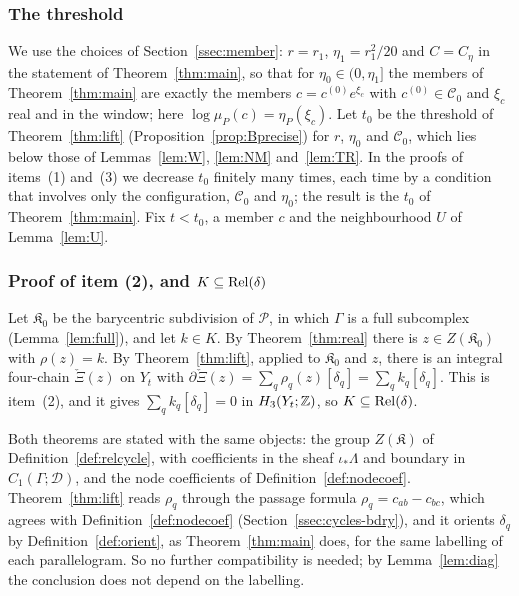 \subsubsection*{The threshold}
We use the choices of Section~\ref{ssec:member}: $r=r_1$, $\eta_1=r_1^2/20$ and $C=C_\eta$ in the statement of
Theorem~\ref{thm:main}, so that for $\eta_0\in(0,\eta_1]$ the members of Theorem~\ref{thm:main} are exactly the members
$c=c^{(0)}e^{\xi_c}$ with $c^{(0)}\in\mathscr C_0$ and $\xi_c$ real and in the window; here $\log\mu_P(c)=\eta_P(\xi_c)$.
Let $t_0$ be the threshold of Theorem~\ref{thm:lift} (Proposition~\ref{prop:Bprecise}) for $r$, $\eta_0$ and
$\mathscr C_0$, which lies below those of Lemmas~\ref{lem:W}, \ref{lem:NM} and~\ref{lem:TR}. In the proofs of items~(1)
and~(3) we decrease $t_0$ finitely many times, each time by a condition that involves only the configuration,
$\mathscr C_0$ and $\eta_0$; the result is the $t_0$ of Theorem~\ref{thm:main}. Fix $t<t_0$, a member $c$ and the
neighbourhood $U$ of Lemma~\ref{lem:U}.

\subsubsection*{Proof of item (2), and $K\subseteq\operatorname{Rel}(\delta)$}
Let $\mathfrak K_0$ be the barycentric subdivision of $\mathscr P$, in which $\Gamma$ is a full subcomplex
(Lemma~\ref{lem:full}), and let $k\in K$. By Theorem~\ref{thm:real} there is $z\in Z(\mathfrak K_0)$ with $\rho(z)=k$. By
Theorem~\ref{thm:lift}, applied to $\mathfrak K_0$ and $z$, there is an integral four-chain $\check\Xi(z)$ on $Y_t$ with
$\partial\check\Xi(z)=\sum_q\rho_q(z)[\delta_q]=\sum_qk_q[\delta_q]$. This is item~(2), and it gives
$\sum_qk_q[\delta_q]=0$ in $H_3(Y_t;\mathbb Z)$, so $K\subseteq\operatorname{Rel}(\delta)$.

Both theorems are stated with the same objects: the group $Z(\mathfrak K)$ of Definition~\ref{def:relcycle}, with
coefficients in the sheaf $\iota_*\Lambda$ and boundary in $C_1(\Gamma;\mathcal D)$, and the node coefficients of
Definition~\ref{def:nodecoef}. Theorem~\ref{thm:lift} reads $\rho_q$ through the passage formula $\rho_q=c_{ab}-c_{bc}$,
which agrees with Definition~\ref{def:nodecoef} (Section~\ref{ssec:cycles-bdry}), and it orients $\delta_q$ by
Definition~\ref{def:orient}, as Theorem~\ref{thm:main} does, for the same labelling of each parallelogram. So no further
compatibility is needed; by Lemma~\ref{lem:diag} the conclusion does not depend on the labelling.


